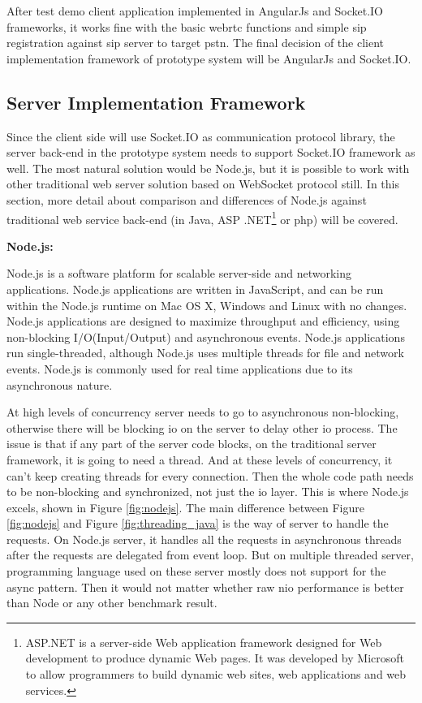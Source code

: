 \par After test demo client application implemented in AngularJs and Socket.IO frameworks, it works fine with the basic \gls{webrtc} functions and simple \gls{sip} registration against \gls{sip} server to target \gls{pstn}. The final decision of the client implementation framework of prototype system will be AngularJs and Socket.IO.

\subsection{Server Implementation Framework}

\noindent Since the client side will use Socket.IO as communication protocol library, the server back-end in the prototype system needs to support Socket.IO framework as well. The most natural solution would be Node.js, but it is possible to work with other traditional web server solution based on WebSocket protocol still. In this section, more detail about comparison and differences of Node.js against traditional web service back-end (in Java, ASP .NET\footnote{ASP.NET is a server-side Web application framework designed for Web development to produce dynamic Web pages. It was developed by Microsoft to allow programmers to build dynamic web sites, web applications and web services.\cite{wiki:asp}} or \gls{php}) will be covered.

\textbf{Node.js:}

\par Node.js is a software platform for scalable server-side and networking applications. Node.js applications are written in JavaScript, and can be run within the Node.js runtime on Mac OS X, Windows and Linux with no changes. Node.js applications are designed to maximize throughput and efficiency, using non-blocking I/O(Input/Output) and asynchronous events. Node.js applications run single-threaded, although Node.js uses multiple threads for file and network events. Node.js is commonly used for real time applications due to its asynchronous nature.\cite{wiki:nodejs}

\par At high levels of concurrency server needs to go to asynchronous non-blocking, otherwise there will be blocking \gls{io} on the server to delay other \gls{io} process. The issue is that if any part of the server code blocks, on the traditional server framework,  it is going to need a thread. And at these levels of concurrency, it can’t keep creating threads for every connection. Then the whole code path needs to be non-blocking and synchronized, not just the \gls{io} layer. This is where Node.js excels, shown in Figure \ref{fig:nodejs}. The main difference between Figure \ref{fig:nodejs} and Figure \ref{fig:threading_java} is the way of server to handle the requests. On Node.js server, it handles all the requests in asynchronous threads after the requests are delegated from event loop. But on multiple threaded server, programming language used on these server mostly does not support for the async pattern. Then it would not matter whether raw \gls{nio} performance is better than Node or any other benchmark result.

